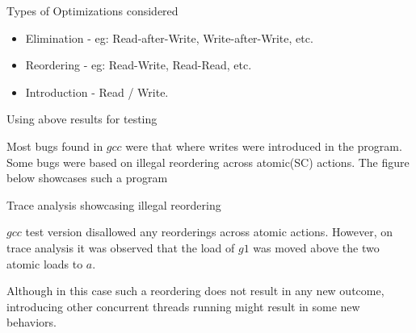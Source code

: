 \documentclass[notes, xcolor=dvipsnames]{beamer}
\begin{document}
    \begin{frame}{Types of Optimizations considered}

        \begin{itemize}
            \item Elimination - eg: Read-after-Write, Write-after-Write, etc.
            \item Reordering - eg: Read-Write, Read-Read, etc.
            \item Introduction - Read / Write. 
        \end{itemize}
        
    \end{frame}

    \begin{frame}{Using above results for testing}

        Most bugs found in $gcc$ were that where writes were introduced in the program. 
        Some bugs were based on illegal reordering across atomic(SC) actions.
        The figure below showcases such a program 
        \begin{figure}
        \end{figure} 

    \end{frame}

    \begin{frame}{Trace analysis showcasing illegal reordering}

        $gcc$ test version disallowed any reorderings across atomic actions. 
        However, on trace analysis it was observed that the load of $g1$ was moved above the two atomic loads to $a$. 
        \begin{figure}
        \end{figure}

        Although in this case such a reordering does not result in any new outcome, introducing other concurrent threads running might result in some new behaviors.
        
    \end{frame}
\end{document}
